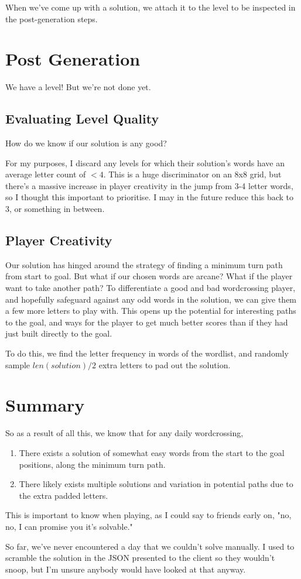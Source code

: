 \documentclass{article}
\begin{document}
When we've come up with a solution, we attach it to the level to be inspected in the 
post-generation steps.

\section{Post Generation}
We have a level! But we're not done yet.

\subsection{Evaluating Level Quality}
How do we know if our solution is any good?

For my purposes, I discard any levels for which their solution's words have an average 
letter count of $< 4$. 
This is a huge discriminator on an 8x8 grid, but there's a massive increase in 
player creativity in the jump from 3-4 letter words, so I thought this important 
to prioritise. I may in the future reduce this back to 3, or something in between.

\subsection{Player Creativity}
Our solution has hinged around the strategy of finding a minimum turn path 
from start to goal. But what if our chosen words are arcane? 
What if the player want to take another path?
To differentiate a good and bad wordcrossing player, and hopefully safeguard 
against any odd words in the solution, we can give them a few more letters to play with.
This opens up the potential for interesting paths to the goal, and ways 
for the player to get much better scores than if they had just built directly
to the goal.

To do this, we find the letter frequency in words of the wordlist, and 
randomly sample $len(solution) / 2$ extra letters to pad out the solution.

\section{Summary}
So as a result of all this, we know that for any daily wordcrossing,
\begin{enumerate}
  \item There exists a solution of somewhat easy words from the start to the
    goal positions, along the minimum turn path.
  \item There likely exists multiple solutions and variation in potential paths 
    due to the extra padded letters.
\end{enumerate}
This is important to know when playing, as I could say to friends early on, "no,
no, I can promise you it's solvable."

So far, we've never encountered a day that we couldn't solve manually. I used 
to scramble the solution in the JSON presented to the client so they wouldn't 
snoop, but I'm unsure anybody would have looked at that anyway.
\end{document}
